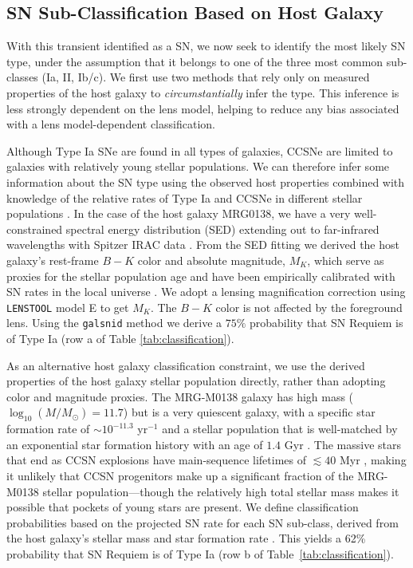\documentclass[12pt,dvipsnames]{article}
\def\SNABC{SN Requiem\xspace}
\def\lenstool{{\tt LENSTOOL}\xspace}
\begin{document}
\subsection*{SN Sub-Classification Based on Host Galaxy}
With this transient identified as a SN, we now seek to identify the most likely SN type, under the assumption that it belongs to one of the three most common sub-classes (Ia, II, Ib/c).   We first use two methods that rely only on measured properties of the host galaxy to {\it circumstantially} infer the type. This inference is less strongly dependent on the lens model, helping to reduce any bias associated with a lens model-dependent classification. 

Although Type Ia SNe are found in all types of galaxies, CCSNe are limited to galaxies with relatively young stellar populations.  We can therefore infer some information about the SN type using the observed host properties combined with knowledge of the relative rates of Type Ia and CCSNe in different stellar populations \cite{mannucci_rates_2005}.  In the case of the host galaxy MRG0138, we have a very well-constrained spectral energy distribution (SED) extending out to far-infrared wavelengths with Spitzer IRAC data \cite{newman_resolving_2018,newman_resolving_2018-1}.  
From the SED fitting we derived the host galaxy's 
rest-frame $B-K$ color and absolute magnitude, $M_K$, which serve as proxies for the stellar population age and have been empirically calibrated with SN rates in the local universe \cite{foley_classifying_2013}.  We adopt a lensing magnification correction using \lenstool model E to get $M_K$.  
The $B-K$ color is not affected by the foreground lens.
Using the {\tt galsnid} method \cite{foley_classifying_2013} we 
derive a $75\%$ probability that \SNABC is of Type Ia (row a of Table \ref{tab:classification}).

As an alternative host galaxy classification constraint, we use the derived properties of the host galaxy stellar population directly,  rather than adopting color and magnitude proxies. The MRG-M0138 galaxy has high mass ($\log_{10}(M/M_{\odot})=11.7$) but is a very quiescent galaxy, with a specific star formation rate of $\sim10^{-11.3}$ yr$^{-1}$  and a stellar population that is well-matched by an exponential star formation history with an age of $1.4$ Gyr \cite{newman_resolving_2018}. 
The massive stars that end as CCSN explosions have main-sequence lifetimes of $\lesssim 40$ Myr \cite{smartt_progenitors_2009},  making it unlikely that CCSN progenitors make up a significant fraction of the MRG-M0138 stellar population---though the relatively high total stellar mass makes it possible that pockets of young stars are present.  We define classification probabilities based on the projected SN rate for each SN sub-class, derived from the host galaxy's stellar mass and star formation rate \cite{li_rates_2012}.  This yields a 62\% probability that \SNABC is of Type Ia (row b of Table~\ref{tab:classification}).
\end{document}
